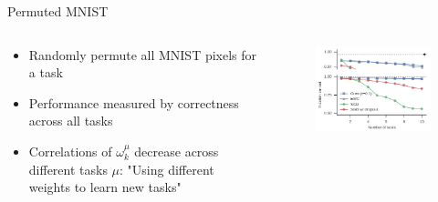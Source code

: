 \documentclass{beamer}
\begin{document}
\begin{frame}{Permuted MNIST}
	\begin{columns}
		\begin{column}{0.5\textwidth}
			\begin{itemize}
			\item Randomly permute all MNIST pixels for a task
			\item Performance measured by correctness across all tasks
			\item Correlations of $\omega_k^\mu$ decrease across different tasks $\mu$: "Using different weights to learn new tasks"
		\end{itemize}
		\end{column}
		\begin{column}{0.5\textwidth}
			\begin{figure}
				
				\centering
				\includegraphics[width=\textwidth]{ML2}
			\end{figure}
		\end{column}
	\end{columns}

\end{frame}
\end{document}
